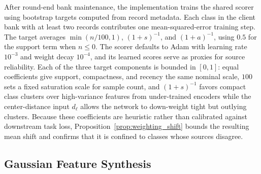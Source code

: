 After round-end bank maintenance, the implementation trains the shared scorer using bootstrap targets computed from record metadata. Each class in the client bank with at least two records contributes one mean-squared-error training step. The target averages $\min(n/100,1)$, $(1+s)^{-1}$, and $(1+a)^{-1}$, using $0.5$ for the support term when $n\le0$. The scorer defaults to Adam with learning rate $10^{-3}$ and weight decay $10^{-4}$, and its learned scores serve as proxies for source reliability. Each of the three target components is bounded in $[0,1]$: equal coefficients give support, compactness, and recency the same nominal scale, $100$ sets a fixed saturation scale for sample count, and $(1+s)^{-1}$ favors compact class clusters over high-variance features from under-trained encoders while the center-distance input $d_\ell$ allows the network to down-weight tight but outlying clusters. Because these coefficients are heuristic rather than calibrated against downstream task loss, Proposition~\ref{prop:weighting_shift} bounds the resulting mean shift and confirms that it is confined to classes whose sources disagree.

\subsection{Gaussian Feature Synthesis}
\label{sec:lowrank}

